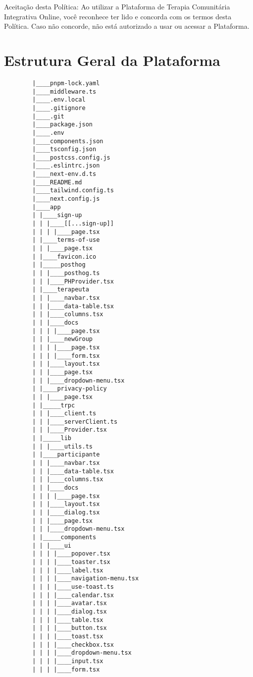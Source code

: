 \begin{apendicesenv}
        Aceitação desta Política:
        Ao utilizar a Plataforma de Terapia Comunitária Integrativa Online, você reconhece ter lido e concorda com os termos desta Política. Caso não concorde, não está autorizado a usar ou acessar a Plataforma.
    
    \chapter{Estrutura Geral da Plataforma}
    \label{appendix:Estrutura geral da plataforma}
        \begin{verbatim}
        |____pnpm-lock.yaml
        |____middleware.ts
        |____.env.local
        |____.gitignore
        |____.git
        |____package.json
        |____.env
        |____components.json
        |____tsconfig.json
        |____postcss.config.js
        |____.eslintrc.json
        |____next-env.d.ts
        |____README.md
        |____tailwind.config.ts
        |____next.config.js
        |____app
        | |____sign-up
        | | |____[[...sign-up]]
        | | | |____page.tsx
        | |____terms-of-use
        | | |____page.tsx
        | |____favicon.ico
        | |_____posthog
        | | |____posthog.ts
        | | |____PHProvider.tsx
        | |____terapeuta
        | | |____navbar.tsx
        | | |____data-table.tsx
        | | |____columns.tsx
        | | |____docs
        | | | |____page.tsx
        | | |____newGroup
        | | | |____page.tsx
        | | | |____form.tsx
        | | |____layout.tsx
        | | |____page.tsx
        | | |____dropdown-menu.tsx
        | |____privacy-policy
        | | |____page.tsx
        | |_____trpc
        | | |____client.ts
        | | |____serverClient.ts
        | | |____Provider.tsx
        | |_____lib
        | | |____utils.ts
        | |____participante
        | | |____navbar.tsx
        | | |____data-table.tsx
        | | |____columns.tsx
        | | |____docs
        | | | |____page.tsx
        | | |____layout.tsx
        | | |____dialog.tsx
        | | |____page.tsx
        | | |____dropdown-menu.tsx
        | |_____components
        | | |____ui
        | | | |____popover.tsx
        | | | |____toaster.tsx
        | | | |____label.tsx
        | | | |____navigation-menu.tsx
        | | | |____use-toast.ts
        | | | |____calendar.tsx
        | | | |____avatar.tsx
        | | | |____dialog.tsx
        | | | |____table.tsx
        | | | |____button.tsx
        | | | |____toast.tsx
        | | | |____checkbox.tsx
        | | | |____dropdown-menu.tsx
        | | | |____input.tsx
        | | | |____form.tsx

\end{verbatim}
\end{apendicesenv}
